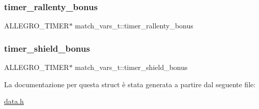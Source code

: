 \subsubsection{\texorpdfstring{timer\+\_\+rallenty\+\_\+bonus}{timer\_rallenty\_bonus}}
{\footnotesize\ttfamily A\+L\+L\+E\+G\+R\+O\+\_\+\+T\+I\+M\+ER$\ast$ match\+\_\+vars\+\_\+t\+::timer\+\_\+rallenty\+\_\+bonus}

\mbox{\label{structmatch__vars__t_a98409cabd79c20cd80959cb2242e683c}} 
\subsubsection{\texorpdfstring{timer\+\_\+shield\+\_\+bonus}{timer\_shield\_bonus}}
{\footnotesize\ttfamily A\+L\+L\+E\+G\+R\+O\+\_\+\+T\+I\+M\+ER$\ast$ match\+\_\+vars\+\_\+t\+::timer\+\_\+shield\+\_\+bonus}



La documentazione per questa struct è stata generata a partire dal seguente file\+:\begin{DoxyCompactItemize}
\item 
\hyperlink{data_8h}{data.\+h}\end{DoxyCompactItemize}
